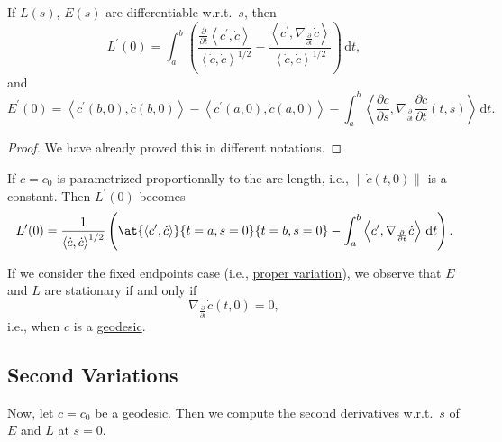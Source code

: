 \begin{lemma}\label{lma:1st-variation-geodesic}
	If \(L(s)\), \(E(s)\) are differentiable w.r.t.\ \(s\), then
	\[
		L^\prime (0) = \int_{a}^{b} \left( \frac{\frac{\partial }{\partial t} \left\langle c^\prime , \dot{c}  \right\rangle }{\left\langle \dot{c} , \dot{c} \right\rangle ^{1 / 2}} - \frac{\left\langle c^\prime , \nabla _{\frac{\partial }{\partial t} } \dot{c} \right\rangle }{\left\langle \dot{c} , \dot{c} \right\rangle ^{1 / 2}}\right)  \,\mathrm{d}t,
	\]
	and
	\[
		E^\prime (0) = \left\langle c^\prime (b, 0), \dot{c} (b, 0) \right\rangle - \left\langle c^\prime (a, 0), \dot{c} (a, 0) \right\rangle - \int_{a}^{b} \left\langle \frac{\partial c}{\partial s} , \nabla _{\frac{\partial }{\partial t} }\frac{\partial c}{\partial t} (t, s) \right\rangle  \,\mathrm{d}t.
	\]
\end{lemma}
\begin{proof}
	We have already proved this in different notations.
\end{proof}

\begin{note}
	If \(c = c_0\) is parametrized proportionally to the arc-length, i.e., \(\lVert \dot{c} (t, 0) \rVert \) is a constant. Then \(L^\prime (0)\) becomes
	\[
		L^\prime (0) = \frac{1}{\left\langle \dot{c} , \dot{c}  \right\rangle ^{1 / 2}} \left( \at{\left\langle c^\prime , \dot{c} \right\rangle }{t=a, s=0}{t=b, s=0} - \int_{a}^{b} \left\langle c^\prime , \nabla _{\frac{\partial }{\partial t} }\dot{c}  \right\rangle  \,\mathrm{d}t \right).
	\]
\end{note}

If we consider the fixed endpoints case (i.e., \hyperref[not:proper-variation]{proper variation}), we observe that \(E\) and \(L\) are stationary if and only if
\[
	\nabla _{\frac{\partial }{\partial t}} \dot{c} (t, 0) = 0,
\]
i.e., when \(c\) is a \hyperref[def:geodesic]{geodesic}.

\subsection{Second Variations}
Now, let \(c = c_0\) be a \hyperref[def:geodesic]{geodesic}. Then we compute the second derivatives w.r.t.\ \(s\) of \(E\) and \(L\) at \(s = 0\).

